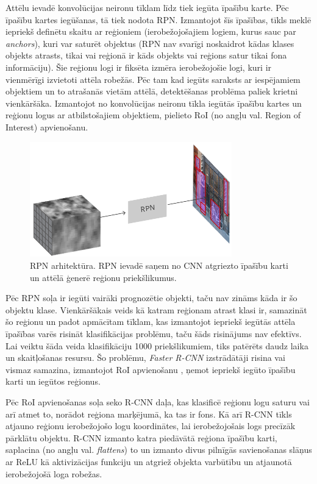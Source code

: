 Attēlu ievadē konvolūcijas neironu tīklam līdz tiek iegūta īpašību karte. Pēc īpašību kartes iegūšanas, tā tiek nodota RPN. Izmantojot šīs īpašības, tīkls meklē iepriekš definētu skaitu ar reģioniem (ierobežojošajiem logiem, kurus sauc par \textit{anchors}), kuri var saturēt objektus (RPN nav svarīgi noskaidrot kādas klases objekts atrasts, tikai vai reģionā ir kāds objekts vai reģions satur tikai fona informāciju).  Šie reģionu logi ir fiksēta izmēra ierobežojošie logi, kuri ir vienmērīgi izvietoti attēla robežās. Pēc tam kad iegūts saraksts ar iespējamiem objektiem un to atrašanās vietām attēlā, detektēšanas problēma paliek krietni vienkāršāka. Izmantojot no konvolūcijas neironu tīkla iegūtās īpašību kartes un reģionu logus ar atbilstošajiem objektiem, pielieto RoI (no angļu val. Region of Interest) apvienošanu.
\begin{figure}[H]%
	\centering
	\includegraphics[height=5cm]{images/rpnstep.png} %
	\caption{RPN arhitektūra. RPN ievadē saņem no CNN atgriezto īpašību karti un attēlā ģenerē reģionu priekšlikumus. \cite{rpnarch}}%
	\label{fig:example}%
\end{figure}
Pēc RPN soļa ir iegūti vairāki prognozētie objekti, taču nav zināms kāda ir šo objektu klase. Vienkāršākais veids kā katram reģionam atrast klasi ir, samazināt šo reģionu un padot apmācītam tīklam, kas izmantojot iepriekš iegūtās attēla īpašības varēs risināt klasifikācijas problēmu, taču šāds risinājums nav efektīvs. Lai veiktu šāda veida klasifikāciju 1000 priekšlikumiem, tiks patērēts daudz laika un skaitļošanas resursu. Šo problēmu, \textit{Faster R-CNN} izstrādātāji risina vai vismaz samazina, izmantojot RoI apvienošanu \cite{roipooling}, ņemot iepriekš iegūto īpašību karti un iegūtos reģionus. 

Pēc RoI apvienošanas soļa seko R-CNN daļa, kas klasificē reģionu logu saturu vai arī atmet to, norādot reģiona marķējumā, ka tas ir fons. Kā arī R-CNN tīkls atjauno reģionu ierobežojošo logu koordinātes, lai ierobežojošais logs precīzāk pārklātu objektu. R-CNN izmanto katra piedāvātā reģiona īpašību karti, saplacina (no angļu val. \textit{flattens}) to un izmanto divus pilnīgās savienošanas slāņus ar ReLU kā aktivizācijas funkciju un atgriež objekta varbūtību un atjaunotā ierobežojošā loga robežas.

